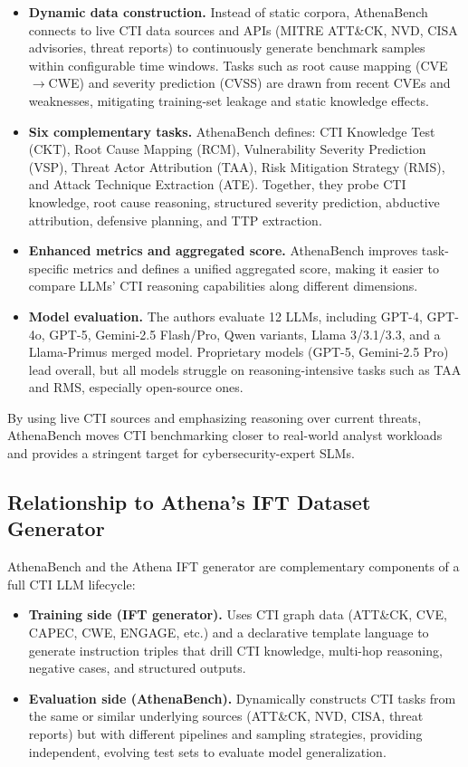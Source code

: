 \documentclass[sigconf]{acmart}
\begin{document}
\begin{itemize}
  \item \textbf{Dynamic data construction.} Instead of static corpora, AthenaBench connects to live CTI data sources and APIs (MITRE ATT\&CK, NVD, CISA advisories, threat reports) to continuously generate benchmark samples within configurable time windows. Tasks such as root cause mapping (CVE$\rightarrow$CWE) and severity prediction (CVSS) are drawn from recent CVEs and weaknesses, mitigating training-set leakage and static knowledge effects.\cite{alam2025athenabench}
  \item \textbf{Six complementary tasks.} AthenaBench defines: CTI Knowledge Test (CKT), Root Cause Mapping (RCM), Vulnerability Severity Prediction (VSP), Threat Actor Attribution (TAA), Risk Mitigation Strategy (RMS), and Attack Technique Extraction (ATE). Together, they probe CTI knowledge, root cause reasoning, structured severity prediction, abductive attribution, defensive planning, and TTP extraction.\cite{alam2025athenabench}
  \item \textbf{Enhanced metrics and aggregated score.} AthenaBench improves task-specific metrics and defines a unified aggregated score, making it easier to compare LLMs' CTI reasoning capabilities along different dimensions.\cite{alam2025athenabench}
  \item \textbf{Model evaluation.} The authors evaluate 12 LLMs, including GPT-4, GPT-4o, GPT-5, Gemini-2.5 Flash/Pro, Qwen variants, Llama 3/3.1/3.3, and a Llama-Primus merged model. Proprietary models (GPT-5, Gemini-2.5 Pro) lead overall, but all models struggle on reasoning-intensive tasks such as TAA and RMS, especially open-source ones.\cite{alam2025athenabench}
\end{itemize}

By using live CTI sources and emphasizing reasoning over current threats, AthenaBench moves CTI benchmarking closer to real-world analyst workloads and provides a stringent target for cybersecurity-expert SLMs.

\subsection{Relationship to Athena's IFT Dataset Generator}

AthenaBench and the Athena IFT generator are complementary components of a full CTI LLM lifecycle:

\begin{itemize}
  \item \textbf{Training side (IFT generator).} Uses CTI graph data (ATT\&CK, CVE, CAPEC, CWE, ENGAGE, etc.) and a declarative template language to generate instruction triples that drill CTI knowledge, multi-hop reasoning, negative cases, and structured outputs.\cite{cardei2025ift}
  \item \textbf{Evaluation side (AthenaBench).} Dynamically constructs CTI tasks from the same or similar underlying sources (ATT\&CK, NVD, CISA, threat reports) but with different pipelines and sampling strategies, providing independent, evolving test sets to evaluate model generalization.\cite{alam2025athenabench}
\end{itemize}
\end{document}
